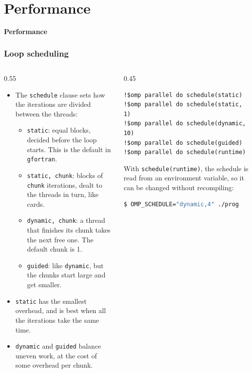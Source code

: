 \section{Performance}

\begin{frame}
  \centering
  \Huge \textbf{Performance}
\end{frame}


\begin{frame}[fragile]
  \frametitle{Loop scheduling}
  \begin{columns}[T]
    \begin{column}{0.55\textwidth}
      \begin{itemize}
        \item The \texttt{schedule} clause sets how the iterations are divided between the threads:
          \begin{itemize}
            \item \texttt{static}: equal blocks, decided before the loop starts. This is the default in \texttt{gfortran}.
            \item \texttt{static, chunk}: blocks of \texttt{chunk} iterations, dealt to the threads in turn, like cards.
            \item \texttt{dynamic, chunk}: a thread that finishes its chunk takes the next free one. The default chunk is 1.
            \item \texttt{guided}: like \texttt{dynamic}, but the chunks start large and get smaller.
          \end{itemize}
        \item \texttt{static} has the smallest overhead, and is best when all the iterations take the same time.
        \item \texttt{dynamic} and \texttt{guided} balance uneven work, at the cost of some overhead per chunk.
      \end{itemize}
    \end{column}

    \begin{column}{0.45\textwidth}
      \begin{lstlisting}
!$omp parallel do schedule(static)
!$omp parallel do schedule(static, 1)
!$omp parallel do schedule(dynamic, 10)
!$omp parallel do schedule(guided)
!$omp parallel do schedule(runtime)
      \end{lstlisting}

      \vspace*{2mm}
      With \texttt{schedule(runtime)}, the schedule is read from an environment variable, so it can be changed without recompiling:
      \begin{lstlisting}[language=bash]
$ OMP_SCHEDULE="dynamic,4" ./prog
      \end{lstlisting}
    \end{column}
  \end{columns}
\end{frame}


